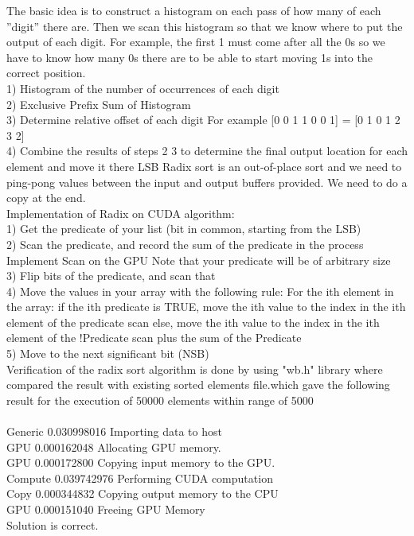 \documentclass[journal]{IEEEtran}
\begin{document}
The basic idea is to construct a histogram on each pass
of how many of each ”digit” there are. Then we scan this
histogram so that we know where to put the output of each
digit. For example, the first 1 must come after all the 0s so
we have to know how many 0s there are to be able to start
moving 1s into the correct position.
\\1) Histogram of the number of occurrences of each digit
\\2) Exclusive Prefix Sum of Histogram
\\3) Determine relative offset of each digit
For example [0 0 1 1 0 0 1] = [0 1 0 1 2 3 2]
\\4) Combine the results of steps 2 3 to determine the final
output location for each element and move it there LSB
Radix sort is an out-of-place sort and we need to ping-pong
values between the input and output buffers provided. We
need to do a copy at the end.
\\Implementation of Radix on CUDA algorithm:
\\1) Get the predicate of your list (bit in common, starting
from the LSB)
\\2) Scan the predicate, and record the sum of the predicate in
the process
Implement Scan on the GPU
Note that your predicate will be of arbitrary size
\\3) Flip bits of the predicate, and scan that
\\4) Move the values in your array with the following rule:
For the ith element in the array:
if the ith predicate is TRUE, move the ith value to the index
in the ith element of the predicate scan
else, move the ith value to the index in the ith element of the
!Predicate scan plus the sum of the Predicate
\\5) Move to the next significant bit (NSB)
\\Verification of the radix sort algorithm is done by using "wb.h" library where 
compared the result with existing sorted elements file.which gave the following result for the execution of 50000 elements within range of 5000
\\
\\ Generic 0.030998016 Importing data to host
\\ GPU     0.000162048 Allocating GPU memory.
\\ GPU     0.000172800 Copying input memory to the GPU.
\\ Compute 0.039742976 Performing CUDA computation
\\ Copy    0.000344832 Copying output memory to the CPU
\\ GPU    0.000151040 Freeing GPU Memory
\\ Solution is correct.
\end{document}
